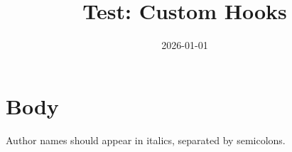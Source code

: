 \documentclass{article}
\title{Test: Custom Hooks}
\date{2026-01-01}
\begin{document}
\maketitle
\section{Body}
Author names should appear in italics, separated by semicolons.
\end{document}
